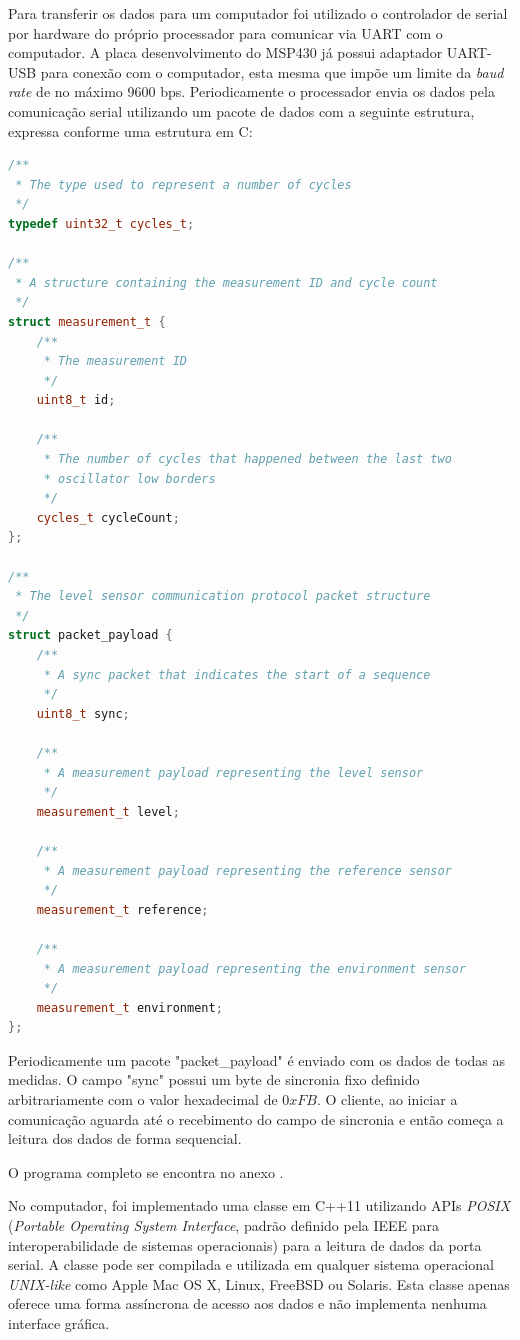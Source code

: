 \documentclass[a4paper]{instrumentacao}
\begin{document}
Para transferir os dados para um computador foi utilizado o controlador de serial por hardware do próprio processador para comunicar via UART com o computador. A placa desenvolvimento do MSP430 já possui adaptador UART-USB para conexão com o computador, esta mesma que impõe um limite da \textit{baud rate} de no máximo 9600 bps. Periodicamente o processador envia os dados pela comunicação serial utilizando um pacote de dados com a seguinte estrutura, expressa conforme uma estrutura em C:

\begin{lstlisting}[caption=Estrutura dos pacotes de conteúdo enviados pela linha de comunicação serial, language=C++, directivestyle={\color{black}} emph={int,char,double,float,unsigned,uint8_t}, emphstyle={\color{blue}}]
/**
 * The type used to represent a number of cycles
 */
typedef uint32_t cycles_t;

/**
 * A structure containing the measurement ID and cycle count
 */
struct measurement_t {
    /**
     * The measurement ID
     */
    uint8_t id;

    /**
     * The number of cycles that happened between the last two 
     * oscillator low borders
     */
    cycles_t cycleCount;
};

/**
 * The level sensor communication protocol packet structure
 */
struct packet_payload {
    /**
     * A sync packet that indicates the start of a sequence
     */
    uint8_t sync;

    /**
     * A measurement payload representing the level sensor
     */
    measurement_t level;

    /**
     * A measurement payload representing the reference sensor
     */
	measurement_t reference;

    /**
     * A measurement payload representing the environment sensor
     */
    measurement_t environment;
};
\end{lstlisting}

Periodicamente um pacote "packet\_payload" é enviado com os dados de todas as medidas. O campo "sync" possui um byte de sincronia fixo definido arbitrariamente com o valor hexadecimal de $0xFB$. O cliente, ao iniciar a comunicação aguarda até o recebimento do campo de sincronia e então começa a leitura dos dados de forma sequencial.

O programa completo se encontra no anexo .

No computador, foi implementado uma classe em C++11 utilizando APIs \textit{POSIX} (\textit{Portable Operating System Interface}, padrão definido pela IEEE para interoperabilidade de sistemas operacionais) para a leitura de dados da porta serial. A classe pode ser compilada e utilizada em qualquer sistema operacional \textit{UNIX-like} como Apple Mac OS X, Linux, FreeBSD ou Solaris. Esta classe apenas oferece uma forma assíncrona de acesso aos dados e não implementa nenhuma interface gráfica.
\end{document}
